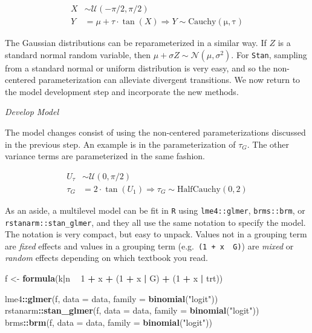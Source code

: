 \documentclass[11pt, oneside, openany]{scrbook}
\newenvironment{Shaded}{\begin{snugshade}}{\end{snugshade}}
\newcommand{\DataTypeTok}[1]{\textcolor[rgb]{0.13,0.29,0.53}{#1}}
\newcommand{\DecValTok}[1]{\textcolor[rgb]{0.00,0.00,0.81}{#1}}
\newcommand{\KeywordTok}[1]{\textcolor[rgb]{0.13,0.29,0.53}{\textbf{#1}}}
\newcommand{\NormalTok}[1]{#1}
\newcommand{\OperatorTok}[1]{\textcolor[rgb]{0.81,0.36,0.00}{\textbf{#1}}}
\newcommand{\StringTok}[1]{\textcolor[rgb]{0.31,0.60,0.02}{#1}}
\begin{document}
\begin{align*}
X &\sim \mathcal{U}(-\pi/2, \pi/2) \\
Y &= \mu + \tau \cdot \tan(X) \Longrightarrow Y \sim \mathrm{Cauchy(\mu, \tau)}
\end{align*}

The Gaussian distributions can be reparameterized in a similar way. If \(Z\) is a standard normal random variable, then \(\mu + \sigma Z \sim \mathcal{N}(\mu, \sigma^2)\). For \texttt{Stan}, sampling from a standard normal or uniform distribution is very easy, and so the non-centered parameterization can alleviate divergent transitions. We now return to the model development step and incorporate the new methods.

\emph{Develop Model}

The model changes consist of using the non-centered parameterizations discussed in the previous step. An example is in the parameterization of \(\tau_{G}\). The other variance terms are parameterized in the same fashion.

\begin{align*}
U_\tau &\sim \mathcal{U}(0, \pi/2) \\
\tau_{G} &= 2 \cdot \tan(U_1) \Longrightarrow \tau_G \sim \mathrm{HalfCauchy}(0, 2)
\end{align*}

As an aside, a multilevel model can be fit in \texttt{R} using \texttt{lme4::glmer}, \texttt{brms::brm}, or \texttt{rstanarm::stan\_glmer}, and they all use the same notation to specify the model. The notation is very compact, but easy to unpack. Values not in a grouping term are \emph{fixed} effects and values in a grouping term (e.g.~\texttt{(1\ +\ x\ \textbar{}\ G)}) are \emph{mixed} or \emph{random} effects depending on which textbook you read.

\begin{Shaded}
\begin{Highlighting}[]
\NormalTok{f <-}\StringTok{ }\KeywordTok{formula}\NormalTok{(k}\OperatorTok{|}\NormalTok{n }\OperatorTok{~}\StringTok{ }\DecValTok{1} \OperatorTok{+}\StringTok{ }\NormalTok{x }\OperatorTok{+}\StringTok{ }\NormalTok{(}\DecValTok{1} \OperatorTok{+}\StringTok{ }\NormalTok{x }\OperatorTok{|}\StringTok{ }\NormalTok{G) }\OperatorTok{+}\StringTok{ }\NormalTok{(}\DecValTok{1} \OperatorTok{+}\StringTok{ }\NormalTok{x }\OperatorTok{|}\StringTok{ }\NormalTok{trt))}

\NormalTok{lme4}\OperatorTok{::}\KeywordTok{glmer}\NormalTok{(f, }\DataTypeTok{data =}\NormalTok{ data, }\DataTypeTok{family =} \KeywordTok{binomial}\NormalTok{(}\StringTok{"logit"}\NormalTok{))}
\NormalTok{rstanarm}\OperatorTok{::}\KeywordTok{stan_glmer}\NormalTok{(f, }\DataTypeTok{data =}\NormalTok{ data, }\DataTypeTok{family =} \KeywordTok{binomial}\NormalTok{(}\StringTok{"logit"}\NormalTok{))}
\NormalTok{brms}\OperatorTok{::}\KeywordTok{brm}\NormalTok{(f, }\DataTypeTok{data =}\NormalTok{ data, }\DataTypeTok{family =} \KeywordTok{binomial}\NormalTok{(}\StringTok{"logit"}\NormalTok{))}
\end{Highlighting}
\end{Shaded}
\end{document}
